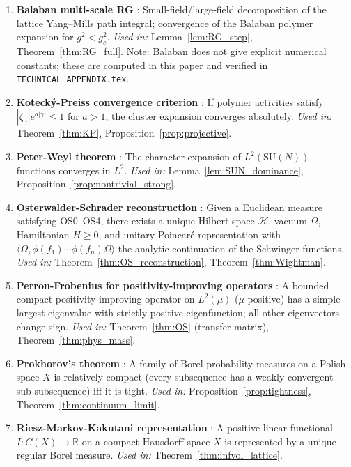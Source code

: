 \documentclass[11pt,a4paper]{amsart}
\theoremstyle{definition}
\newcommand{\SU}{\mathrm{SU}}
\newcommand{\R}{\mathbb{R}}
\begin{document}
\begin{enumerate}
\item \textbf{Balaban multi-scale RG} \cite{B85,B87,B88,B89a,B89b}:
Small-field/large-field decomposition of the lattice Yang--Mills path integral;
convergence of the Balaban polymer expansion for $g^2 < g^2_c$.
\textit{Used in:} Lemma~\ref{lem:RG_step}, Theorem~\ref{thm:RG_full}.
Note: Balaban does not give explicit numerical constants; these are computed
in this paper and verified in \texttt{TECHNICAL\_APPENDIX.tex}.

\item \textbf{Koteck\'y-Preiss convergence criterion} \cite{KP86}:
If polymer activities satisfy $|\zeta_\gamma| e^{a|\gamma|} \le 1$ for $a > 1$,
the cluster expansion converges absolutely.
\textit{Used in:} Theorem~\ref{thm:KP}, Proposition~\ref{prop:projective}.

\item \textbf{Peter-Weyl theorem} \cite{PW27}:
The character expansion of $L^2(\SU(N))$ functions converges in $L^2$.
\textit{Used in:} Lemma~\ref{lem:SUN_dominance}, Proposition~\ref{prop:nontrivial_strong}.

\item \textbf{Osterwalder-Schrader reconstruction} \cite{OS75,OS73}:
Given a Euclidean measure satisfying OS0--OS4, there exists a unique Hilbert
space $\mathcal{H}$, vacuum $\Omega$, Hamiltonian $H \ge 0$, and unitary
Poincar\'e representation with $\langle\Omega, \phi(f_1)\cdots\phi(f_n)\Omega\rangle$
the analytic continuation of the Schwinger functions.
\textit{Used in:} Theorem~\ref{thm:OS_reconstruction}, Theorem~\ref{thm:Wightman}.

\item \textbf{Perron-Frobenius for positivity-improving operators}
\cite[Thm.~XIII.44]{ReedSimon4}: A bounded compact positivity-improving
operator on $L^2(\mu)$ ($\mu$ positive) has a simple largest eigenvalue
with strictly positive eigenfunction; all other eigenvectors change sign.
\textit{Used in:} Theorem~\ref{thm:OS} (transfer matrix), Theorem~\ref{thm:phys_mass}.

\item \textbf{Prokhorov's theorem} \cite{Billingsley}:
A family of Borel probability measures on a Polish space $X$ is relatively
compact (every subsequence has a weakly convergent sub-subsequence) iff
it is tight.
\textit{Used in:} Proposition~\ref{prop:tightness}, Theorem~\ref{thm:continuum_limit}.

\item \textbf{Riesz-Markov-Kakutani representation} \cite{Reed75}:
A positive linear functional $I : C(X) \to \R$ on a compact Hausdorff space
$X$ is represented by a unique regular Borel measure.
\textit{Used in:} Theorem~\ref{thm:infvol_lattice}.


\end{enumerate}
\end{document}
